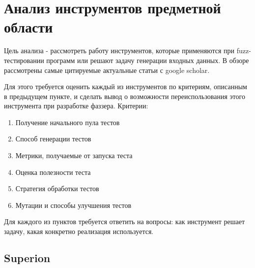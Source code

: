 \documentclass[a4paper]{article}
\begin{document}
\newpage
\section{Анализ инструментов предметной области}
\indent

Цель анализа - рассмотреть работу инструментов, которые применяются при fuzz-тестировании программ или решают задачу генерации входных данных. В обзоре рассмотрены самые цитируемые актуальные статьи с google scholar. 

Для этого требуется оценить каждый из инструментов по критериям, описанным в предыдущем пункте, и сделать вывод о возможности переиспользования этого инструмента при разработке фаззера. Критерии: 
\begin{enumerate}
    \item Получение начального пула тестов
    \item Способ генерации тестов
    \item Метрики, получаемые от запуска теста
    \item Оценка полезности теста
    \item Стратегия обработки тестов
    \item Мутации и способы улучшения тестов
\end{enumerate}

Для каждого из пунктов требуется ответить на вопросы: как инструмент решает задачу, какая конкретно реализация используется. 


\subsection{Superion}
\indent
\end{document}
